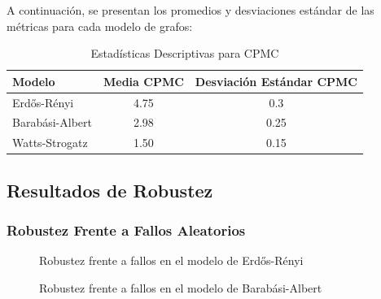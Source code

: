A continuación, se presentan los promedios y desviaciones estándar de las métricas para cada modelo de grafos:

\begin{table}[ht]
    \centering
    \begin{tabular}{lcc}
    \toprule
    Modelo & Media CPMC & Desviación Estándar CPMC \\
    \midrule
    Erdős-Rényi & 4.75 & 0.3 \\
    Barabási-Albert & 2.98 & 0.25 \\
    Watts-Strogatz & 1.50 & 0.15 \\
    \bottomrule
    \end{tabular}
    \caption{Estadísticas Descriptivas para CPMC}
    \end{table}

\newpage
\subsection{Resultados de Robustez}

\subsubsection{Robustez Frente a Fallos Aleatorios}

\begin{figure}[h]
    \caption{Robustez frente a fallos en el modelo de Erdős-Rényi}
\end{figure}

\begin{figure}[h]
    \caption{Robustez frente a fallos en el modelo de Barabási-Albert}
\end{figure}

